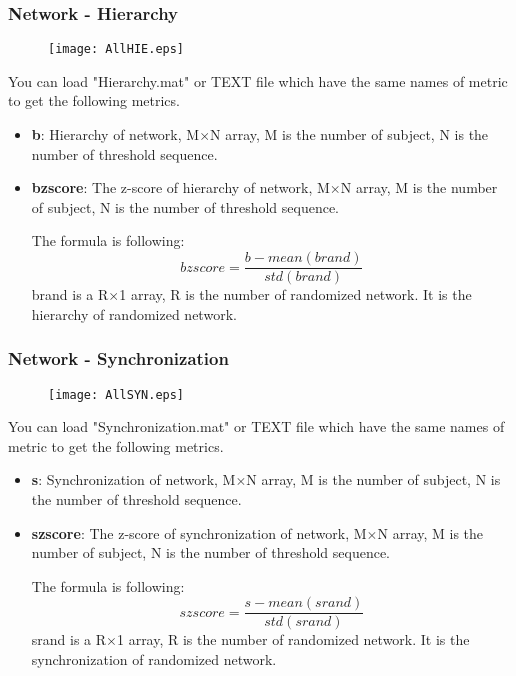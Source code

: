 \documentclass[11pt]{article}
\begin{document}
			\subsubsection{Network - Hierarchy}
				\begin{figure}
					\begin{center}
						\texttt{[image: AllHIE.eps]}
					\end{center}
				\end{figure}
				You can load "Hierarchy.mat" or TEXT file which have the same names of metric to get the following metrics.
				\begin{itemize}
					\item \textbf{b}: Hierarchy of network,
						M$\times$N array, M is the number of subject, N is the number of threshold sequence.
					\item \textbf{bzscore}: The z-score of hierarchy of network,
						M$\times$N array, M is the number of subject, N is the number of threshold sequence.

						The formula is following:
						$$bzscore=\frac{b-mean(brand)}{std(brand)}$$
						brand is a R$\times$1 array, R is the number of randomized network. 
						It is the hierarchy of randomized network.
				\end{itemize}
			\subsubsection{Network - Synchronization}
				\begin{figure}
					\begin{center}
						\texttt{[image: AllSYN.eps]}
					\end{center}
				\end{figure}
				You can load "Synchronization.mat" or TEXT file which have the same names of metric to get the following metrics.
				\begin{itemize}
					\item \textbf{s}: Synchronization of network,
						M$\times$N array, M is the number of subject, N is the number of threshold sequence.
					\item \textbf{szscore}: The z-score of synchronization of network,
						M$\times$N array, M is the number of subject, N is the number of threshold sequence.

						The formula is following:
						$$szscore=\frac{s-mean(srand)}{std(srand)}$$
						srand is a R$\times$1 array, R is the number of randomized network. 
						It is the synchronization of randomized network.
				\end{itemize}
\end{document}
